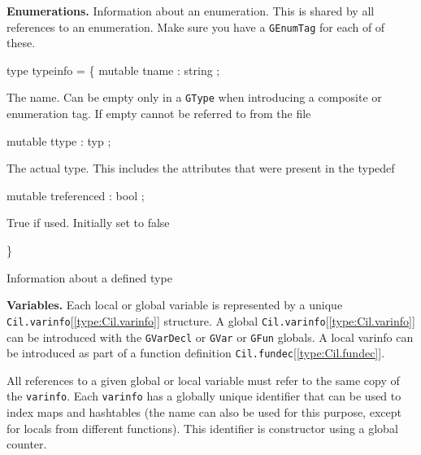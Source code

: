 \documentclass[11pt]{article}
\begin{document}
{\bf Enumerations.} Information about an enumeration. This is shared by all 
 references to an enumeration. Make sure you have a {\tt{GEnumTag}} for each of 
 of these.



\label{type:Cil.typeinfo}\begin{ocamldoccode}
type typeinfo = \{
  mutable tname : string ;
\end{ocamldoccode}
\begin{ocamldoccomment}
The name. Can be empty only in a {\tt{GType}} when introducing a composite 
 or enumeration tag. If empty cannot be referred to from the file
\end{ocamldoccomment}
\begin{ocamldoccode}
  mutable ttype : typ ;
\end{ocamldoccode}
\begin{ocamldoccomment}
The actual type. This includes the attributes that were present in 
 the typedef
\end{ocamldoccomment}
\begin{ocamldoccode}
  mutable treferenced : bool ;
\end{ocamldoccode}
\begin{ocamldoccomment}
True if used. Initially set to false
\end{ocamldoccomment}
\begin{ocamldoccode}
\}
\end{ocamldoccode}
\begin{ocamldocdescription}
Information about a defined type


\end{ocamldocdescription}




{\bf Variables.} 
 Each local or global variable is represented by a unique {\tt{Cil.varinfo}}[\ref{type:Cil.varinfo}]
structure. A global {\tt{Cil.varinfo}}[\ref{type:Cil.varinfo}] can be introduced with the {\tt{GVarDecl}} or
{\tt{GVar}} or {\tt{GFun}} globals. A local varinfo can be introduced as part of a
function definition {\tt{Cil.fundec}}[\ref{type:Cil.fundec}]. 


 All references to a given global or local variable must refer to the same
copy of the {\tt{varinfo}}. Each {\tt{varinfo}} has a globally unique identifier that 
can be used to index maps and hashtables (the name can also be used for this 
purpose, except for locals from different functions). This identifier is 
constructor using a global counter.
\end{document}
